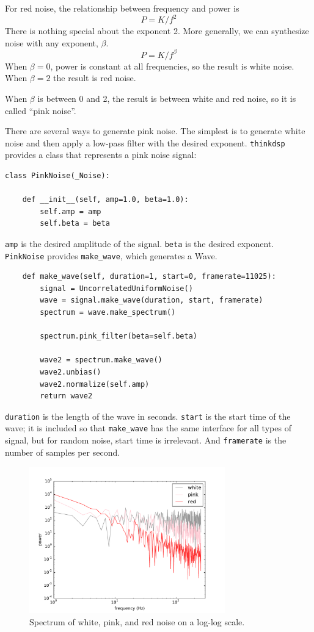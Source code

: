 \documentclass[12pt]{book}
\begin{document}
For red noise, the relationship between frequency
and power is
%
\[ P = K / f^{2} \]
%
There is nothing special about the exponent 2.  More generally,
we can synthesize noise with any exponent, $\beta$.
%
\[ P = K / f^{\beta} \]
%
When $\beta = 0$, power is constant at all frequencies,
so the result is white noise.  When $\beta=2$ the result is red noise.

When $\beta$ is between 0 and 2, the result is between white and
red noise, so it is called ``pink noise''.

There are several ways to generate pink noise.  The simplest is to
generate white noise and then apply a low-pass filter with the
desired exponent.  {\tt thinkdsp} provides a class that represents
a pink noise signal:

\begin{verbatim}
class PinkNoise(_Noise):

    def __init__(self, amp=1.0, beta=1.0):
        self.amp = amp
        self.beta = beta
\end{verbatim}

{\tt amp} is the desired amplitude of the signal.
{\tt beta} is the desired exponent.  {\tt PinkNoise} provides
\verb"make_wave", which generates a Wave.

\begin{verbatim}
    def make_wave(self, duration=1, start=0, framerate=11025):
        signal = UncorrelatedUniformNoise()
        wave = signal.make_wave(duration, start, framerate)
        spectrum = wave.make_spectrum()

        spectrum.pink_filter(beta=self.beta)

        wave2 = spectrum.make_wave()
        wave2.unbias()
        wave2.normalize(self.amp)
        return wave2
\end{verbatim}

{\tt duration} is the length of the wave in seconds.  {\tt start} is
the start time of the wave; it is included so that \verb"make_wave"
has the same interface for all types of signal, but for random noise,
start time is irrelevant.  And {\tt framerate} is the number of
samples per second.

\begin{figure}
\centerline{\includegraphics[height=2.5in]{figs/noise-triple.pdf}}
\caption{Spectrum of white, pink, and red noise on a log-log scale.}
\label{fig.noise-triple}
\end{figure}
\end{document}
